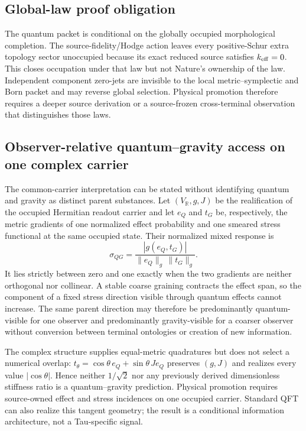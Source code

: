 \documentclass[11pt]{article}
\begin{document}
\subsection*{Global-law proof obligation}

The quantum packet is conditional on the globally occupied morphological
completion.  The source-fidelity/Hodge action leaves every positive-Schur
extra topology sector unoccupied because its exact reduced source satisfies
\(k_{\rm eff}=0\).  This closes occupation under that law but not Nature's
ownership of the law.  Independent component zero-jets are invisible to the
local metric--symplectic and Born packet and may reverse global selection.
Physical promotion therefore requires a deeper source derivation or a
source-frozen cross-terminal observation that distinguishes those laws.

\subsection*{Observer-relative quantum--gravity access on one complex carrier}

The common-carrier interpretation can be stated without identifying quantum
and gravity as distinct parent substances.  Let $(V_{\mathbb R},g,J)$ be the
realification of the occupied Hermitian readout carrier and let $e_Q$ and
$t_G$ be, respectively, the metric gradients of one normalized effect
probability and one smeared stress functional at the same occupied state.
Their normalized mixed response is
\[
 \sigma_{QG}=\frac{|g(e_Q,t_G)|}{\|e_Q\|_g\,\|t_G\|_g}.
\]
It lies strictly between zero and one exactly when the two gradients are
neither orthogonal nor collinear.  A stable coarse graining contracts the
effect span, so the component of a fixed stress direction visible through
quantum effects cannot increase.  The same parent direction may therefore be
predominantly quantum-visible for one observer and predominantly
gravity-visible for a coarser observer without conversion between terminal
ontologies or creation of new information.

The complex structure supplies equal-metric quadratures but does not select a
numerical overlap: $t_\theta=\cos\theta\,e_Q+\sin\theta\,Je_Q$ preserves
$(g,J)$ and realizes every value $|\cos\theta|$.  Hence neither
$1/\sqrt2$ nor any previously derived dimensionless stiffness ratio is a
quantum--gravity prediction.  Physical promotion requires source-owned
effect and stress incidences on one occupied carrier.  Standard QFT can also
realize this tangent geometry; the result is a conditional information
architecture, not a Tau-specific signal.
\end{document}
